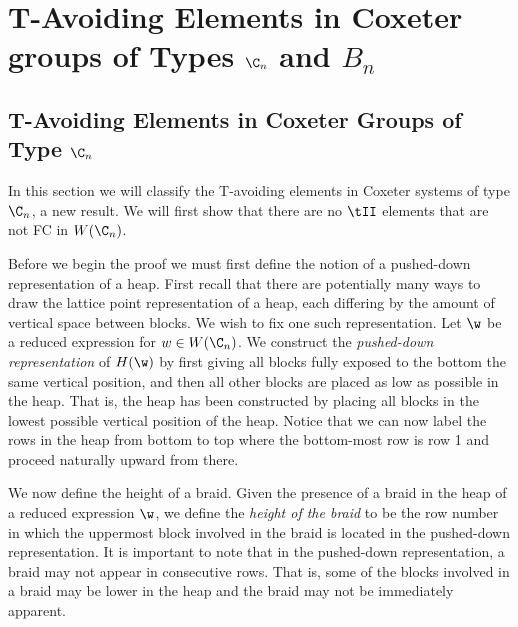\section{T-Avoiding Elements in Coxeter groups of Types $\C_n$ and $B_n$}\label{chap:Cn}



\subsection{T-Avoiding Elements in Coxeter Groups of Type $\C_n$}\label{sec:TAC}

In this section we will classify the T-avoiding elements in Coxeter systems of type $\C_n$, a new result. We will first show that there are no $\tII$ elements that are not FC in $W(\C_n)$.

Before we begin the proof we must first define the notion of a pushed-down representation of a heap. First recall that there are potentially many ways to draw the lattice point representation of a heap, each differing by the amount of vertical space between blocks. We wish to fix one such representation. Let $\w$ be a reduced expression for $w \in W(\C_n)$. We construct the \emph{pushed-down representation} of $H(\w)$ by first giving all blocks fully exposed to the bottom the same vertical position, and then all other blocks are placed as low as possible in the heap. That is, the heap has been constructed by placing all blocks in the lowest possible vertical position of the heap. Notice that we can now label the rows in the heap from bottom to top where the bottom-most row is row 1 and proceed naturally upward from there. 

We now define the height of a braid. Given the presence of a braid in the heap of a reduced expression $\w$, we define the \emph{height of the braid} to be the row number in which the uppermost block involved in the braid is located in the pushed-down representation. It is important to note that in the pushed-down representation, a braid may not appear in consecutive rows. That is, some of the blocks involved in a braid may be lower in the heap and the braid may not be immediately apparent. 

